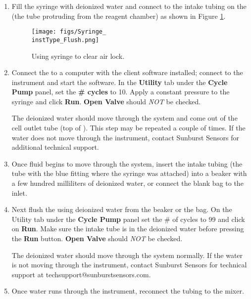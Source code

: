 \begin{enumerate}

    \item Fill the syringe with deionized water and connect to the intake tubing on the \instType{} (the tube protruding from the reagent chamber) as shown in Figure \ref{fig:SyringeFlush}.
    
    \begin{figure}[hb!]
    \centering
    \texttt{[image: figs/Syringe\_\\instType\_Flush.png]}
    \caption{Using syringe to clear air lock.}
    \label{fig:SyringeFlush}
    \end{figure}
    
    \item Connect the \instType{} to a computer with the client software installed; connect to the instrument and start the software. In the \textbf{Utility} tab under the \textbf{Cycle Pump} panel, set the \textbf{\# cycles} to 10. Apply a constant pressure to the syringe and click \textbf{Run}.  \textbf{Open Valve} should \textit{NOT} be checked.
    
    The deionized water should move through the system and come out of the cell outlet tube (top of \instType{}). This step may be repeated a couple of times. If the water does not move through the instrument, contact Sunburst Sensors for additional technical support. 
    
    \item Once fluid begins to move through the system, insert the intake tubing (the tube with the blue fitting where the syringe was attached) into a beaker with a few hundred milliliters of deionized water, or connect the blank bag to the inlet. 
    
    \item Next flush the \instType{} using deionized water from the beaker or the bag. On the Utility tab under the \textbf{Cycle Pump} panel set the \# of cycles to 99 and click on \textbf{Run}. Make sure the intake tube is in the deionized water before pressing the \textbf{Run} button.  \textbf{Open Valve} should \textit{NOT} be checked.
    
    The deionized water should move through the system normally. If the water is not moving through the instrument, contact Sunburst Sensors for technical support at techsupport@sunburstsensors.com.
    
    \item Once water runs through the instrument, reconnect the tubing to the mixer. 
    

\end{enumerate}

